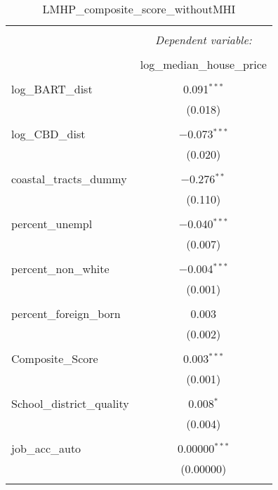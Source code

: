 \documentclass[10pt, letterpaper]{amsart}
\begin{document}
\begin{table}[!htbp] \centering 
  \caption{LMHP\_composite\_score\_withoutMHI} 
  \label{} 
  \begin{tabular}{@{\extracolsep{5pt}}lc} 
    \\[-1.8ex]\hline 
    \hline \\[-1.8ex] 
    & \multicolumn{1}{c}{\textit{Dependent variable:}} \\ 
    \cline{2-2} 
    \\[-1.8ex] & log\_median\_house\_price \\ 
    \hline \\[-1.8ex] 
    log\_BART\_dist & 0.091$^{***}$ \\ 
    & (0.018) \\ 
    & \\ 
    log\_CBD\_dist & $-$0.073$^{***}$ \\ 
    & (0.020) \\ 
    & \\ 
    coastal\_tracts\_dummy & $-$0.276$^{**}$ \\ 
    & (0.110) \\ 
    & \\ 
    percent\_unempl & $-$0.040$^{***}$ \\ 
    & (0.007) \\ 
    & \\ 
    percent\_non\_white & $-$0.004$^{***}$ \\ 
    & (0.001) \\ 
    & \\ 
    percent\_foreign\_born & 0.003 \\ 
    & (0.002) \\ 
    & \\ 
    Composite\_Score & 0.003$^{***}$ \\ 
    & (0.001) \\ 
    & \\ 
    School\_district\_quality & 0.008$^{*}$ \\ 
    & (0.004) \\ 
    & \\ 
    job\_acc\_auto & 0.00000$^{***}$ \\ 
    & (0.00000) \\ 
    & \\ 

\end{tabular}
\end{table}
\end{document}
